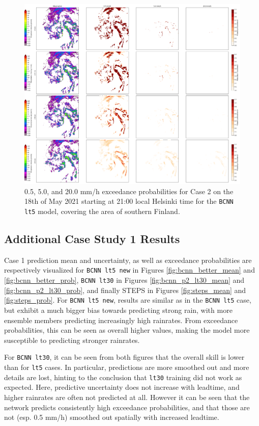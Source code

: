 \begin{figure}[ht]
	\centering
	\includegraphics[width=\textwidth]{images/cases/bcnn_prob_case2}
	\caption{0.5, 5.0, and 20.0 mm/h exceedance probabilities for Case 2 on the 18th of May 2021 starting at 21:00 local Helsinki time for the \texttt{BCNN lt5} model, covering the area of southern Finland.}
	\label{fig:bcnn_prob_case2}
\end{figure}

\subsection{Additional Case Study 1 Results}

Case 1 prediction mean and uncertainty, as well as exceedance probabilities are respectively visualized for \texttt{BCNN lt5 new} in Figures \ref{fig:bcnn_better_mean} and \ref{fig:bcnn_better_prob}, \texttt{BCNN lt30} in Figures \ref{fig:bcnn_p2_lt30_mean} and \ref{fig:bcnn_p2_lt30_prob}, and finally STEPS in Figures \ref{fig:steps_mean} and \ref{fig:steps_prob}. For \texttt{BCNN lt5 new}, results are similar as in the \texttt{BCNN lt5} case, but exhibit a much bigger bias towards predicting strong rain, with more ensemble members predicting increasingly high rainrates. From exceedance probabilities, this can be seen as overall higher values, making the model more susceptible to predicting stronger rainrates. 

For \texttt{BCNN lt30}, it can be seen from both figures that the overall skill is lower than for \texttt{lt5} cases. In particular, predictions are more smoothed out and more details are lost, hinting to the conclusion that \texttt{lt30} training did not work as expected. Here, predictive uncertainty does not increase with leadtime, and higher rainrates are often not predicted at all. However it can be seen that the network predicts consistently high exceedance probabilities, and that those are not (esp. 0.5 mm/h) smoothed out spatially with increased leadtime. 

